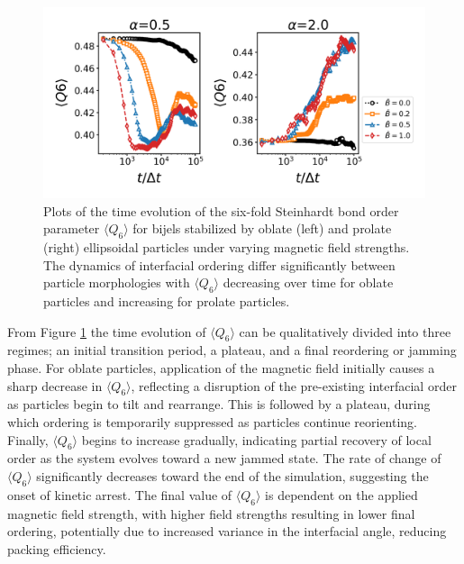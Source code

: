 \begin{figure} 
    \centering 
    \includegraphics[scale=0.5]{../figures/results/paper2/Q6-field_on.png} 
    \caption{Plots of the time evolution of the six-fold Steinhardt bond order parameter \(\langle Q_6 \rangle\) for bijels 
             stabilized by oblate (left) and prolate (right) ellipsoidal particles under varying magnetic field strengths. The dynamics of interfacial ordering differ 
             significantly between particle morphologies with \(\langle Q_6 \rangle\) decreasing over time for oblate particles and increasing for prolate particles.} 
    \label{fig:interface_angle-field_on} 
\end{figure}

From Figure \ref{fig:interface_angle-field_on} the time evolution of \(\langle Q_6 \rangle\) can be qualitatively divided into three regimes;
an initial transition period, a plateau, and a final reordering or jamming phase.
For oblate particles, application of the magnetic field initially causes a sharp decrease in \(\langle Q_6 \rangle\), reflecting a disruption of the 
pre-existing interfacial order as particles begin to tilt and rearrange. This is followed by a plateau, during which ordering is temporarily suppressed 
as particles continue reorienting. Finally, \(\langle Q_6 \rangle\) begins to increase gradually, indicating partial recovery of local order as the system 
evolves toward a new jammed state. The rate of change of \(\langle Q_6 \rangle\) significantly decreases toward the end of the simulation, suggesting the onset 
of kinetic arrest. The final value of \(\langle Q_6 \rangle\) is dependent on the applied magnetic field strength, with higher field strengths 
resulting in lower final ordering, potentially due to increased variance in the interfacial angle, reducing packing efficiency.

